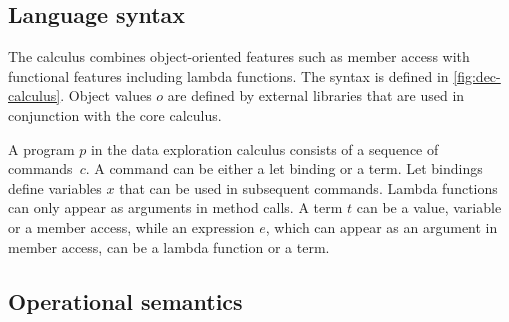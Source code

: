 \documentclass[english,crc,references=cleveref]{programming}
\theoremstyle{plain}
\theoremstyle{definition}
\begin{document}

\subsection{Language syntax}
The calculus combines object-oriented features such as member access with functional features
including lambda functions. The syntax is defined in \cref{fig:dec-calculus}. Object values
$o$ are defined by external libraries that are used in conjunction with the core calculus.

A program $p$ in the data exploration calculus consists of a sequence of commands~$c$. A command
can be either a let binding or a term. Let bindings define variables $x$ that can be used in
subsequent commands. Lambda functions
can only appear as arguments in method calls. A term $t$ can be a value, variable or a
member access, while an expression $e$, which can appear as an argument in member access,
can be a lambda function or a term.


\subsection{Operational semantics}
\label{sec:calculus-semantics}
\end{document}
